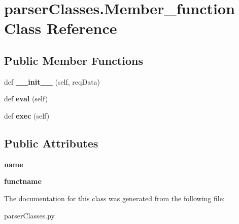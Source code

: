 \hypertarget{classparser_classes_1_1_member__function}{}\section{parser\+Classes.\+Member\+\_\+function Class Reference}
\label{classparser_classes_1_1_member__function}
\subsection*{Public Member Functions}
\begin{DoxyCompactItemize}
\item 
\mbox{\label{classparser_classes_1_1_member__function_a497b32d0e46480abd8f4f573ee68a3b0}} 
def {\bfseries \+\_\+\+\_\+init\+\_\+\+\_\+} (self, req\+Data)
\item 
\mbox{\label{classparser_classes_1_1_member__function_ae132533c55122b32a25746696db39249}} 
def {\bfseries eval} (self)
\item 
\mbox{\label{classparser_classes_1_1_member__function_aa938612d9582fb3851370a7680f84efe}} 
def {\bfseries exec} (self)
\end{DoxyCompactItemize}
\subsection*{Public Attributes}
\begin{DoxyCompactItemize}
\item 
\mbox{\label{classparser_classes_1_1_member__function_a3937d00f545419b14a3807f66fb89a8b}} 
{\bfseries name}
\item 
\mbox{\label{classparser_classes_1_1_member__function_a01cc4459bfeab553a8fb2c3f99110b7e}} 
{\bfseries functname}
\end{DoxyCompactItemize}


The documentation for this class was generated from the following file\+:\begin{DoxyCompactItemize}
\item 
parser\+Classes.\+py\end{DoxyCompactItemize}
